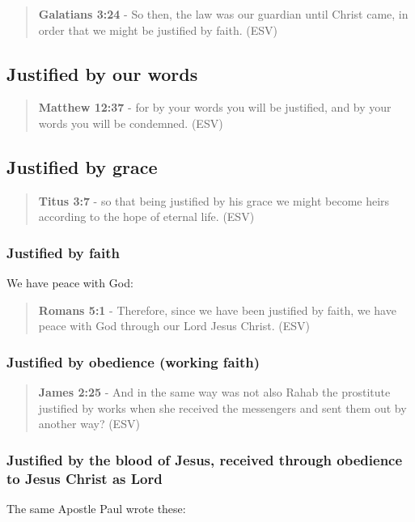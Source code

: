 \documentclass[11pt]{article}
\begin{document}
\begin{quote}
\textbf{Galatians 3:24} - So then, the law was our guardian until Christ came, in order that we might be justified by faith. (ESV)
\end{quote}

\subsection{Justified by our words}
\label{sec:orgee7e678}
\begin{quote}
\textbf{Matthew 12:37} - for by your words you will be justified, and by your words you will be condemned. (ESV)
\end{quote}

\subsection{Justified by grace}
\label{sec:orgcb1517a}
\begin{quote}
\textbf{Titus 3:7} - so that being justified by his grace we might become heirs according to the hope of eternal life. (ESV)
\end{quote}

\subsubsection{Justified by faith}
\label{sec:org028125a}

We have peace with God:

\begin{quote}
\textbf{Romans 5:1} - Therefore, since we have been justified by faith, we have peace with God through our Lord Jesus Christ. (ESV)
\end{quote}

\subsubsection{Justified by obedience (working faith)}
\label{sec:org91b8db2}

\begin{quote}
\textbf{James 2:25} - And in the same way was not also Rahab the prostitute justified by works when she received the messengers and sent them out by another way? (ESV)
\end{quote}

\subsubsection{Justified by the blood of Jesus, received through obedience to Jesus Christ as Lord}
\label{sec:org1ba5f9a}
The same Apostle Paul wrote these:
\end{document}
